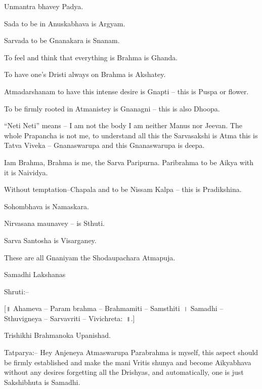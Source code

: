  \item Unmantra bhavey Padya.

 \item Sada to be in Anuskabhava is Argyam.

 \item Sarvada to be Gnanakara is Snanam.

 \item To feel and think that everything is Brahma is Ghanda.

 \item To have one's Dristi always on Brahma is Akshatey.

 \item Atmadarshanam to have this intense desire is Gnapti – this is Puspa or flower.

 \item To be firmly rooted in Atmanistey is Gnanagni – this is also Dhoopa.

 \item “Neti Neti” means – I am not the body I am neither Manus nor Jeevan. The whole Prapancha is not me, to understand all this the Sarvasakshi is Atma this is Tatva Viveka – Gnanaswarupa and this Gnanaswarupa is deepa.

 \item Iam Brahma, Brahma is me, the Sarva Paripurna. Paribrahma to be Aikya with it is Naividya.

 \item Without temptation–Chapala and to be Nissam Kalpa – this is Pradikshina.

 \item Sohombhava is Namaskara.

 \item Nirvasana maunavey – is Sthuti.

 \item Sarva Santosha is Visarganey.

 \item These are all Gnaniyam the Shodaupachara Atmapuja.


Samadhi Lakshanas

Shruti:–

[॥ Ahameva – Param brahma – Brahmamiti – Samsthiti~। Samadhi – Sthuvigneya – Sarvavriti – Vivichreta:~॥.]

Trishikhi Brahmanoka Upanishad.

Tatparya:– Hey Anjeneya Atmaswarupa Parabrahma is myself, this aspect should be firmly established and make the mani Vritis shunya and become Aikyabhava without any desires forgetting all the Drishyas, and automatically, one is just Sakshibhuta is Samadhi.

